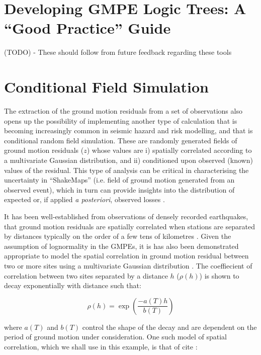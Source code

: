 \section{Developing GMPE Logic Trees: A ``Good Practice'' Guide}
\label{sec:logic_tree}

(TODO) - These should follow from future feedback regarding these tools

\section{Conditional Field Simulation}
\label{sec:cond_field}

The extraction of the ground motion residuals from a set of observations also opens up the possibility of implementing another type of calculation that is becoming increasingly common in seismic hazard and risk modelling, and that is conditional random field simulation. These are randomly generated fields of ground motion residuals ($z$) whose values are i) spatially correlated according to a multivariate Gaussian distribution, and ii) conditioned upon observed (known) values of the residual. This type of analysis can be critical in characterising the uncertainty in ``ShakeMaps'' (i.e. field of ground motion generated from an observed event), which in turn can provide insights into the distribution of expected or, if applied \emph{a posteriori}, observed losses \citep[e.g.][]{Park_etal2007, Crowley_etal2008b, Stafford2012}.

It has been well-established from observations of densely recorded earthquakes, that ground motion residuals are spatially correlated when stations are separated by distances typically on the order of a few tens of kilometres \citep{Jayaram2009}. Given the assumption of lognormality in the GMPEs, it is has also been demonstrated appropriate to model the spatial correlation in ground motion residual between two or more sites using a multivariate Gaussian distribution \citep{JayaramBaker2009}. The coeffiecient of correlation between two sites separated by a distance $h$ ($\rho \left( h \right)$) is shown to decay exponentially with distance such that:

\begin{equation}
\rho \left( h \right) = \exp \left( {\frac{-a\left(T\right) h}{b \left(T\right)}} \right)
\end{equation}

\noindent where $a\left( T \right)$ and $b\left( T \right)$ control the shape of the decay and are dependent on the period of ground motion under consideration. One such model of spatial correlation, which we shall use in this example, is that of cite \cite{Jayaram2009}:

